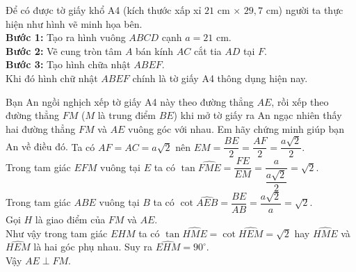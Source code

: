 \begin{ex}%
 \immini
 { 
 Để có được tờ giấy khổ A4 (kích thước xấp xỉ $21$ cm $\times$ $29{,}7$ cm) người ta thực hiện như hình vẽ minh họa bên.\\
 \textbf{Bước 1:} Tạo ra hình vuông $ABCD$ cạnh $a = 21$ cm.\\
 \textbf{Bước 2:} Vẽ cung tròn tâm $A$ bán kính $AC$ cắt tia $AD$ tại $F$.\\
 \textbf{Bước 3:} Tạo hình chữa nhật $ABEF$.\\
 Khi đó hình chữ nhật $ABEF$ chính là tờ giấy A4 thông dụng hiện nay.\\
 }
 {
 }
 \noindent
 Bạn An ngồi nghịch xếp tờ giấy A4 này theo đường thẳng $AE$, rồi xếp theo đường thẳng $FM$ ($M$ là trung điểm $BE$) khi mở tờ giấy ra An ngạc nhiên thấy hai đường thẳng $FM$ và $AE$ vuông góc với nhau. Em hãy chứng minh giúp bạn An về điều đó.
 \loigiai
  {
  \immini
  {
  Ta có $AF = AC = a\sqrt{2}$ nên $EM = \dfrac{BE}{2} = \dfrac{AF}{2} = \dfrac{a\sqrt{2}}{2}$.\\
  Trong tam giác $EFM$ vuông tại $E$ ta có $\tan \widehat{FME} = \dfrac{FE}{EM} = \dfrac{a}{\dfrac{a\sqrt{2}}{2}} = \sqrt{2}$.\\
  Trong tam giác $ABE$ vuông tại $B$ ta có $\cot \widehat{AEB} = \dfrac{BE}{AB} = \dfrac{a\sqrt{2}}{a} = \sqrt{2}$.\\
  Gọi $H$ là giao điểm của $FM$ và $AE$.\\
  Như vậy trong tam giác $EHM$ ta có $\tan \widehat{HME} = \cot \widehat{HEM} = \sqrt{2}$ hay $\widehat{HME}$ và $\widehat{HEM}$ là hai góc phụ nhau. Suy ra $\widehat{EHM} = 90^\circ$.\\
  Vậy $AE \perp FM$.
  }
}
\end{ex}

